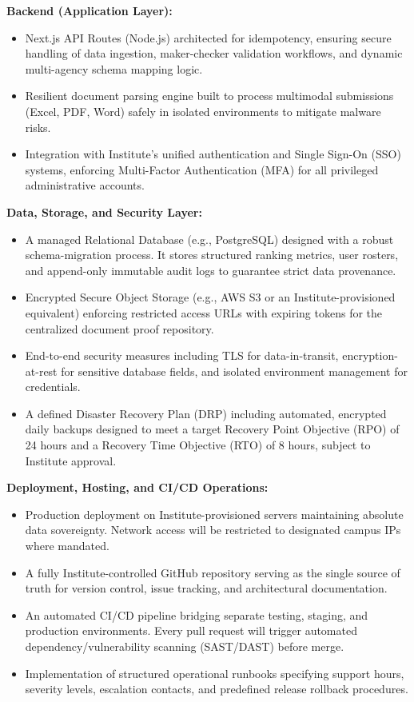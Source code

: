 \documentclass[11pt]{article}
\begin{document}
\textbf{Backend (Application Layer):}
\begin{itemize}[leftmargin=1.4em, itemsep=3pt]
\item Next.js API Routes (Node.js) architected for idempotency, ensuring secure handling of data ingestion, maker-checker validation workflows, and dynamic multi-agency schema mapping logic.
\item Resilient document parsing engine built to process multimodal submissions (Excel, PDF, Word) safely in isolated environments to mitigate malware risks.
\item Integration with Institute's unified authentication and Single Sign-On (SSO) systems, enforcing Multi-Factor Authentication (MFA) for all privileged administrative accounts.
\end{itemize}

\textbf{Data, Storage, and Security Layer:}
\begin{itemize}[leftmargin=1.4em, itemsep=3pt]
\item A managed Relational Database (e.g., PostgreSQL) designed with a robust schema-migration process. It stores structured ranking metrics, user rosters, and append-only immutable audit logs to guarantee strict data provenance.
\item Encrypted Secure Object Storage (e.g., AWS S3 or an Institute-provisioned equivalent) enforcing restricted access URLs with expiring tokens for the centralized document proof repository.
\item End-to-end security measures including TLS for data-in-transit, encryption-at-rest for sensitive database fields, and isolated environment management for credentials.
\item A defined Disaster Recovery Plan (DRP) including automated, encrypted daily backups designed to meet a target Recovery Point Objective (RPO) of 24 hours and a Recovery Time Objective (RTO) of 8 hours, subject to Institute approval.
\end{itemize}

\textbf{Deployment, Hosting, and CI/CD Operations:}
\begin{itemize}[leftmargin=1.4em, itemsep=3pt]
\item Production deployment on Institute-provisioned servers maintaining absolute data sovereignty. Network access will be restricted to designated campus IPs where mandated.
\item A fully Institute-controlled GitHub repository serving as the single source of truth for version control, issue tracking, and architectural documentation.
\item An automated CI/CD pipeline bridging separate testing, staging, and production environments. Every pull request will trigger automated dependency/vulnerability scanning (SAST/DAST) before merge.
\item Implementation of structured operational runbooks specifying support hours, severity levels, escalation contacts, and predefined release rollback procedures.
\end{itemize}
\end{document}
